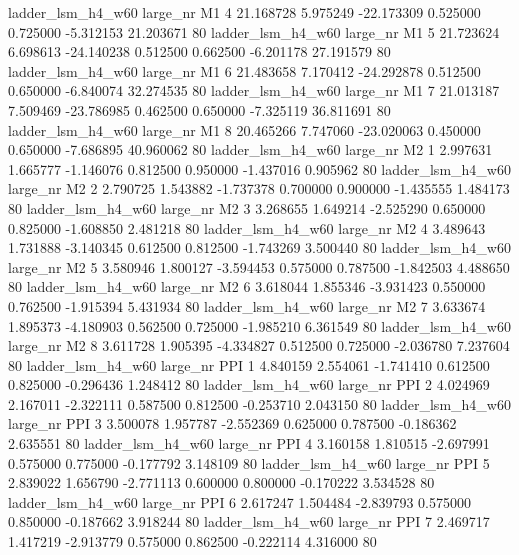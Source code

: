   ladder_lsm_h4_w60   large_nr       M1                 4 21.168728  5.975249 -22.173309 0.525000 0.725000 -5.312153   21.203671 80
  ladder_lsm_h4_w60   large_nr       M1                 5 21.723624  6.698613 -24.140238 0.512500 0.662500 -6.201178   27.191579 80
  ladder_lsm_h4_w60   large_nr       M1                 6 21.483658  7.170412 -24.292878 0.512500 0.650000 -6.840074   32.274535 80
  ladder_lsm_h4_w60   large_nr       M1                 7 21.013187  7.509469 -23.786985 0.462500 0.650000 -7.325119   36.811691 80
  ladder_lsm_h4_w60   large_nr       M1                 8 20.465266  7.747060 -23.020063 0.450000 0.650000 -7.686895   40.960062 80
  ladder_lsm_h4_w60   large_nr       M2                 1  2.997631  1.665777  -1.146076 0.812500 0.950000 -1.437016    0.905962 80
  ladder_lsm_h4_w60   large_nr       M2                 2  2.790725  1.543882  -1.737378 0.700000 0.900000 -1.435555    1.484173 80
  ladder_lsm_h4_w60   large_nr       M2                 3  3.268655  1.649214  -2.525290 0.650000 0.825000 -1.608850    2.481218 80
  ladder_lsm_h4_w60   large_nr       M2                 4  3.489643  1.731888  -3.140345 0.612500 0.812500 -1.743269    3.500440 80
  ladder_lsm_h4_w60   large_nr       M2                 5  3.580946  1.800127  -3.594453 0.575000 0.787500 -1.842503    4.488650 80
  ladder_lsm_h4_w60   large_nr       M2                 6  3.618044  1.855346  -3.931423 0.550000 0.762500 -1.915394    5.431934 80
  ladder_lsm_h4_w60   large_nr       M2                 7  3.633674  1.895373  -4.180903 0.562500 0.725000 -1.985210    6.361549 80
  ladder_lsm_h4_w60   large_nr       M2                 8  3.611728  1.905395  -4.334827 0.512500 0.725000 -2.036780    7.237604 80
  ladder_lsm_h4_w60   large_nr      PPI                 1  4.840159  2.554061  -1.741410 0.612500 0.825000 -0.296436    1.248412 80
  ladder_lsm_h4_w60   large_nr      PPI                 2  4.024969  2.167011  -2.322111 0.587500 0.812500 -0.253710    2.043150 80
  ladder_lsm_h4_w60   large_nr      PPI                 3  3.500078  1.957787  -2.552369 0.625000 0.787500 -0.186362    2.635551 80
  ladder_lsm_h4_w60   large_nr      PPI                 4  3.160158  1.810515  -2.697991 0.575000 0.775000 -0.177792    3.148109 80
  ladder_lsm_h4_w60   large_nr      PPI                 5  2.839022  1.656790  -2.771113 0.600000 0.800000 -0.170222    3.534528 80
  ladder_lsm_h4_w60   large_nr      PPI                 6  2.617247  1.504484  -2.839793 0.575000 0.850000 -0.187662    3.918244 80
  ladder_lsm_h4_w60   large_nr      PPI                 7  2.469717  1.417219  -2.913779 0.575000 0.862500 -0.222114    4.316000 80
